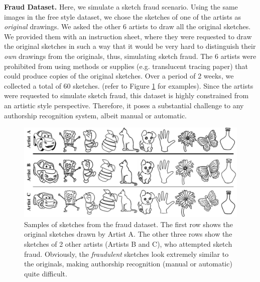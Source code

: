 \noindent\textbf{Fraud Dataset.}  Here, we simulate a sketch fraud scenario. Using the same images in the free style dataset, we chose the sketches of one of the artists as \emph{original} drawings. We asked the other 6 artists to draw all the original sketches. We provided them with an instruction sheet, where they were requested to draw the original sketches in such a way that it would be very hard to distinguish their \emph{own} drawings from the originals, thus, simulating sketch fraud. The 6 artists were prohibited from using methods or supplies (e.g. translucent tracing paper) that could produce copies of the original sketches. Over a period of 2 weeks, we collected a total of 60 sketches. (refer to Figure \ref{FraudDataset} for examples). Since the artists were requested to simulate sketch fraud, this dataset is highly constrained from an artistic style perspective. Therefore, it poses a substantial challenge to any authorship recognition system, albeit manual or automatic.

\begin{figure}[htbp!]
\centering
\includegraphics[width = 1.0\textwidth]{images/fraudExperiment.jpg}
\vspace{-6mm}\caption {Samples of sketches from the fraud dataset. The first row shows the original sketches drawn by Artist A. The other three rows show the sketches of 2 other artists (Artists B and C), who attempted  sketch fraud. Obviously, the \emph{fraudulent} sketches look extremely similar to the originals, making authorship recognition (manual or automatic) quite difficult.}\vspace{-5mm}
\label{FraudDataset}
\end{figure}

